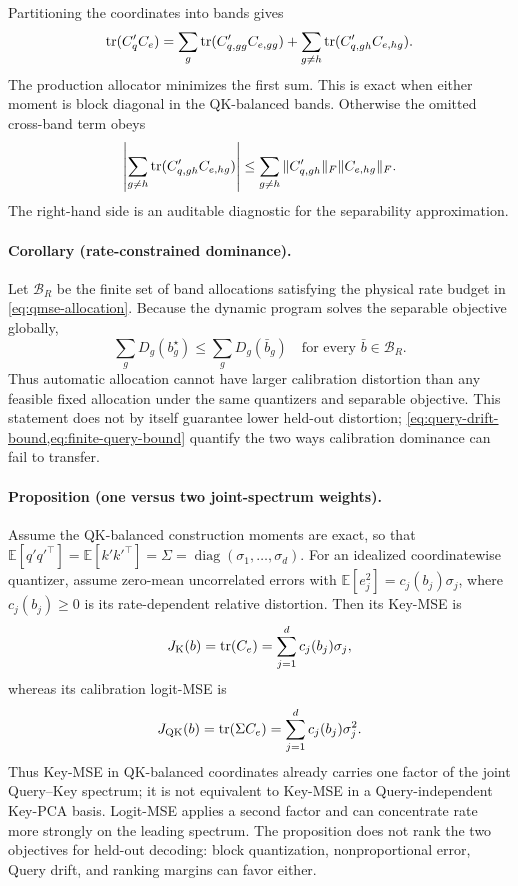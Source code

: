 Partitioning the coordinates into bands gives
\begin{equation}
 \operatorname{tr}(C'_qC_e)=
 \sum_g\operatorname{tr}(C'_{q,gg}C_{e,gg})
 +\sum_{g\ne h}\operatorname{tr}(C'_{q,gh}C_{e,hg}).
 \label{eq:block-qmse}
\end{equation}
The production allocator minimizes the first sum.
This is exact when either moment is block diagonal in the QK-balanced bands.
Otherwise the omitted cross-band term obeys
\begin{equation}
 \left|\sum_{g\ne h}\operatorname{tr}(C'_{q,gh}C_{e,hg})\right|
 \le\sum_{g\ne h}
 \|C'_{q,gh}\|_F\|C_{e,hg}\|_F.
 \label{eq:cross-band-bound}
\end{equation}
The right-hand side is an auditable diagnostic for the separability
approximation.

\paragraph{Corollary (rate-constrained dominance).}
Let $\mathcal B_R$ be the finite set of band allocations satisfying the
physical rate budget in \cref{eq:qmse-allocation}.  Because the dynamic
program solves the separable objective globally,
\begin{equation}
 \sum_gD_g(b_g^\star)\le\sum_gD_g(\bar b_g)
 \quad\text{for every }\bar b\in\mathcal B_R.
 \label{eq:allocation-dominance}
\end{equation}
Thus automatic allocation cannot have larger calibration distortion than
any feasible fixed allocation under the same quantizers and separable
objective.  This statement does not by itself guarantee lower held-out
distortion; \cref{eq:query-drift-bound,eq:finite-query-bound} quantify the
two ways calibration dominance can fail to transfer.

\paragraph{Proposition (one versus two joint-spectrum weights).}
Assume the QK-balanced construction moments are exact, so that
$\mathbb E[q'q'^\top]=\mathbb E[k'k'^\top]
=\Sigma=\operatorname{diag}(\sigma_1,\ldots,\sigma_d)$.
For an idealized coordinatewise quantizer, assume zero-mean uncorrelated
errors with
$\mathbb E[e_j^2]=c_j(b_j)\sigma_j$, where $c_j(b_j)\ge0$ is its
rate-dependent relative distortion.  Then its Key-MSE is
\begin{equation}
 J_{\rm K}(b)=\operatorname{tr}(C_e)
 =\sum_{j=1}^{d}c_j(b_j)\sigma_j,
 \label{eq:keymse-joint-spectrum}
\end{equation}
whereas its calibration logit-MSE is
\begin{equation}
 J_{\rm QK}(b)=\operatorname{tr}(\Sigma C_e)
 =\sum_{j=1}^{d}c_j(b_j)\sigma_j^2.
 \label{eq:qmse-joint-spectrum}
\end{equation}
Thus Key-MSE in QK-balanced coordinates already carries one factor of the
joint Query--Key spectrum; it is not equivalent to Key-MSE in a
Query-independent Key-PCA basis.  Logit-MSE applies a second factor and can
concentrate rate more strongly on the leading spectrum.  The proposition
does not rank the two objectives for held-out decoding: block quantization,
nonproportional error, Query drift, and ranking margins can favor either.

